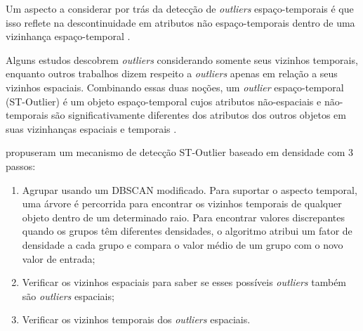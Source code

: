 Um aspecto a considerar por trás da detecção de \textit{outliers} espaço-temporais é que isso reflete na descontinuidade em atributos não espaço-temporais dentro de uma vizinhança espaço-temporal \cite{cheng:2014}.

Alguns estudos descobrem \textit{outliers} considerando somente seus vizinhos temporais, enquanto outros trabalhos dizem respeito a \textit{outliers} apenas em relação a seus vizinhos espaciais. Combinando essas duas noções, um \textit{outlier} espaço-temporal (ST-Outlier) é um objeto espaço-temporal cujos atributos não-espaciais e não-temporais são significativamente diferentes dos atributos dos outros objetos em suas vizinhanças espaciais e temporais \cite{gupta:2014}.

\cite{Birant2006SpatiotemporalOD} propuseram um mecanismo de detecção ST-Outlier baseado em densidade com 3 passos:
\begin{enumerate}
    \item Agrupar usando um DBSCAN modificado. Para suportar o aspecto temporal, uma árvore é percorrida para encontrar
os vizinhos temporais de qualquer objeto dentro de um determinado raio. Para encontrar valores discrepantes quando os grupos têm diferentes densidades, o algoritmo atribui um fator de densidade a cada grupo e compara o valor médio de um grupo com o novo valor de entrada;
    \item Verificar os vizinhos espaciais para saber se esses possíveis \textit{outliers} também são \textit{outliers} espaciais;
    \item Verificar os vizinhos temporais dos \textit{outliers} espaciais.
\end{enumerate}
